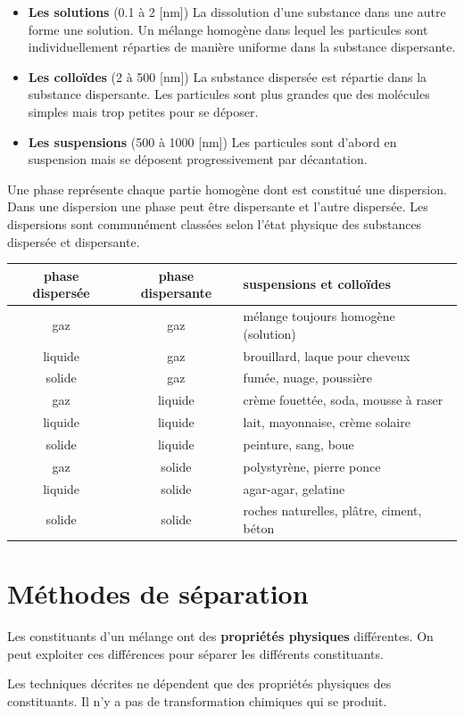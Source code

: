 \documentclass[
  11pt,
  french,
  a4paper,
  openany]{book}
\providecommand{\tightlist}{%
  \setlength{\itemsep}{0pt}\setlength{\parskip}{0pt}}
\begin{document}
\begin{itemize}
\tightlist
\item
  \textbf{Les solutions} (0.1 à 2 {[}nm{]})
  La dissolution d'une substance dans une autre forme une solution. Un mélange homogène dans lequel les particules sont individuellement réparties de manière uniforme dans la substance dispersante.
\item
  \textbf{Les colloïdes} (2 à 500 {[}nm{]})
  La substance dispersée est répartie dans la substance dispersante. Les particules sont plus grandes que des molécules simples mais trop petites pour se déposer.
\item
  \textbf{Les suspensions} (500 à 1000 {[}nm{]})
  Les particules sont d'abord en suspension mais se déposent progressivement par décantation.
\end{itemize}

Une phase représente chaque partie homogène dont est constitué une dispersion. Dans une dispersion une phase peut être dispersante et l'autre dispersée. Les dispersions sont communément classées selon l'état physique des substances dispersée et dispersante.

\begin{longtable}[]{@{}ccl@{}}
\toprule
phase dispersée & phase dispersante & suspensions et colloïdes\tabularnewline
\midrule
\endhead
gaz & gaz & mélange toujours homogène (solution)\tabularnewline
liquide & gaz & brouillard, laque pour cheveux\tabularnewline
solide & gaz & fumée, nuage, poussière\tabularnewline
gaz & liquide & crème fouettée, soda, mousse à raser\tabularnewline
liquide & liquide & lait, mayonnaise, crème solaire\tabularnewline
solide & liquide & peinture, sang, boue\tabularnewline
gaz & solide & polystyrène, pierre ponce\tabularnewline
liquide & solide & agar-agar, gelatine\tabularnewline
solide & solide & roches naturelles, plâtre, ciment, béton\tabularnewline
\bottomrule
\end{longtable}

\newpage

\hypertarget{muxe9thodes-de-suxe9paration}{%
\section{Méthodes de séparation}\label{muxe9thodes-de-suxe9paration}}

Les constituants d'un mélange ont des \textbf{propriétés physiques} différentes. On peut exploiter ces différences pour séparer les différents constituants.

Les techniques décrites ne dépendent que des propriétés physiques des constituants. Il n'y a pas de transformation chimiques qui se produit.
\end{document}
